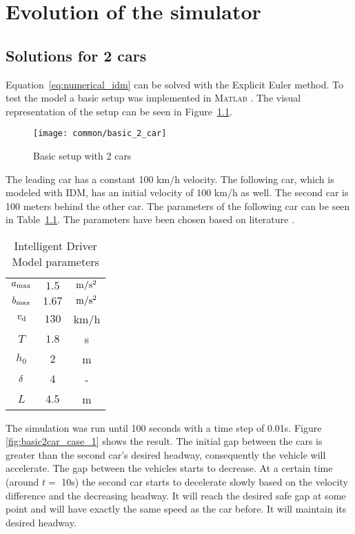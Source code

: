 \chapter{Evolution of the simulator}
	\section{Solutions for 2 cars}\label{sec:base2car}
		Equation~\eqref{eq:numerical_idm} can be solved with the Explicit Euler method. To test the model a basic setup was implemented in \textsc{Matlab} \cite{matlab}. The visual representation of the setup can be seen in Figure~\ref{fig:basic2car}.
		\begin{figure}
			\centering
			\texttt{[image: common/basic\_2\_car]}
			\caption{Basic setup with 2 cars}
			\label{fig:basic2car}
		\end{figure}
		The leading car has a constant 100 km/h velocity. The following car, which is modeled with IDM, has an initial velocity of 100 km/h as well. The second car is 100 meters behind the other car. The parameters of the following car can be seen in Table~\ref{tab:idm_params}. The parameters have been chosen based on literature \cite{opensource}.
		\begin{table}
			\begin{center}
				\begin{tabular}{ |c|c|c| }
					\hline
					$a_{\rm max}$ & $1.5$ & $\rm m/s^2$ \\
					$b_{\rm max}$ & $1.67$ & $\rm m/s^2$ \\
					$v_{\rm d}$ & $130$ & km/h \\
					$T$ & $1.8$ & s \\
					$h_0$ & $2$ & m \\
					$\rm \delta$ & $4$ & - \\
					$L$ & $4.5$ & m \\
					\hline
				\end{tabular}
			\end{center}
			\caption{Intelligent Driver Model parameters}
			\label{tab:idm_params}
		\end{table}
		The simulation was run until 100 seconds with a time step of 0.01s. Figure \ref{fig:basic2car_case_1} shows the result. The initial gap between the cars is greater than the second car's desired headway, consequently the vehicle will accelerate. The gap between the vehicles starts to decrease. At a certain time (around $t =$ 10s) the second car starts to decelerate slowly based on the velocity difference and the decreasing headway. It will reach the desired safe gap at some point and will have exactly the same speed as the car before. It will maintain its desired headway.

